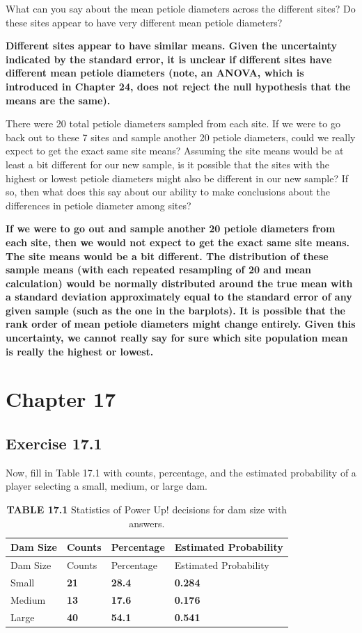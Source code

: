 \documentclass[
  openany]{krantz}
\begin{document}
What can you say about the mean petiole diameters across the different sites? Do these sites appear to have very different mean petiole diameters?

\textbf{Different sites appear to have similar means. Given the uncertainty indicated by the standard error, it is unclear if different sites have different mean petiole diameters (note, an ANOVA, which is introduced in Chapter 24, does not reject the null hypothesis that the means are the same).}

There were 20 total petiole diameters sampled from each site. If we were to go back out to these 7 sites and sample another 20 petiole diameters, could we really expect to get the exact same site means? Assuming the site means would be at least a bit different for our new sample, is it possible that the sites with the highest or lowest petiole diameters might also be different in our new sample? If so, then what does this say about our ability to make conclusions about the differences in petiole diameter among sites?

\textbf{If we were to go out and sample another 20 petiole diameters from each site, then we would not expect to get the exact same site means. The site means would be a bit different. The distribution of these sample means (with each repeated resampling of 20 and mean calculation) would be normally distributed around the true mean with a standard deviation approximately equal to the standard error of any given sample (such as the one in the barplots). It is possible that the rank order of mean petiole diameters might change entirely. Given this uncertainty, we cannot really say for sure which site population mean is really the highest or lowest.}

\hypertarget{chapter-17}{%
\section{Chapter 17}\label{chapter-17}}

\hypertarget{exercise-17.1}{%
\subsection{Exercise 17.1}\label{exercise-17.1}}

Now, fill in Table 17.1 with counts, percentage, and the estimated probability of a player selecting a small, medium, or large dam.

\begin{longtable}[]{@{}llll@{}}
\caption{\textbf{TABLE 17.1} Statistics of Power Up! decisions for dam size with answers.}\tabularnewline
\toprule
Dam Size & Counts & Percentage & Estimated Probability \\
\midrule
\endfirsthead
\toprule
Dam Size & Counts & Percentage & Estimated Probability \\
\midrule
\endhead
Small & \textbf{21} & \textbf{28.4} & \textbf{0.284} \\
Medium & \textbf{13} & \textbf{17.6} & \textbf{0.176} \\
Large & \textbf{40} & \textbf{54.1} & \textbf{0.541} \\
\bottomrule
\end{longtable}
\end{document}
